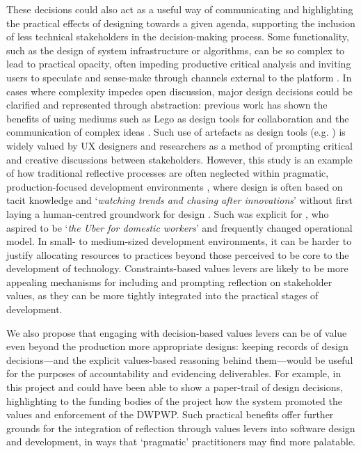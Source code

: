 These decisions could also act as a useful way of communicating and highlighting the practical effects of designing towards a given agenda, supporting the inclusion of less technical stakeholders in the decision-making process. Some functionality, such as the design of system infrastructure or algorithms, can be so complex to lead to practical opacity, often impeding productive critical analysis and inviting users to speculate and sense-make through channels external to the platform \cite{lee2015}. In cases where complexity impedes open discussion, major design decisions could be clarified and represented through abstraction: previous work has shown the benefits of using mediums such as Lego as design tools for collaboration and the communication of complex ideas \cite{Cantoni2009}. Such use of artefacts as design tools (e.g. \cite{GrowAGame, Alshehri2020}) is widely valued by UX designers and researchers as a method of prompting critical and creative discussions between stakeholders. However, this study is an example of how traditional reflective processes are often neglected within pragmatic, production-focused development environments \cite{Shilton2013}, where design is often based on tacit knowledge and `\textit{watching trends and chasing after innovations}' without first laying a human-centred groundwork for design \citep{ogunyemi2016}. Such was explicit for \PC{}, who aspired to be `\textit{the Uber for domestic workers}' and frequently changed operational model. In small- to medium-sized development environments, it can be harder to justify allocating resources to practices beyond those perceived to be core to the development of technology. Constraints-based values levers are likely to be more appealing mechanisms for including and prompting reflection on stakeholder values, as they can be more tightly integrated into the practical stages of development.

We also propose that engaging with decision-based values levers can be of value even beyond the production more appropriate designs: keeping records of design decisions---and the explicit values-based reasoning behind them---would be useful for the purposes of accountability and evidencing deliverables. For example, in this project \NGO{} and \PC{} could have been able to show a paper-trail of design decisions, highlighting to the funding bodies of the \SRP{} project how the system promoted the values and enforcement of the DWPWP. Such practical benefits offer further grounds for the integration of reflection through values levers into software design and development, in ways that `pragmatic' practitioners may find more palatable.

